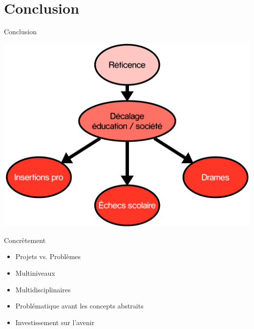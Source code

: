 \section{Conclusion}

\begin{frame}{Conclusion}
   \begin{center}
     \includegraphics[width=.7\textwidth]{../resources/illustrations/ccl}
   \end{center}
\end{frame}

\begin{frame}{Concrètement}
\begin{itemize}
  \item Projets vs. Problèmes
  \pause
  \item Multiniveaux
  \pause
  \item Multidisciplinaires
  \pause
  \item Problématique avant les concepts abstraits
  \pause
  \item Investissement sur l'avenir
\end{itemize}
\end{frame}

